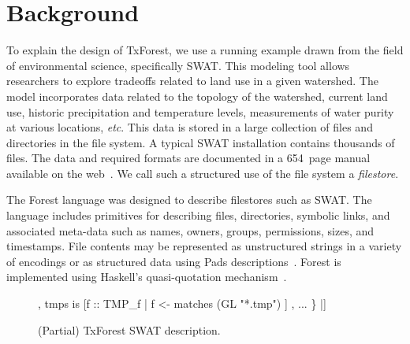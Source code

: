 \section{Background}
\label{sec:Background}


To explain the design of TxForest, we use a running example drawn from
the field of environmental science, specifically SWAT.  This modeling
tool allows researchers to explore tradeoffs related to land use in a
given watershed.  The model incorporates data related to the topology
of the watershed, current land use, historic precipitation and
temperature levels, measurements of water purity at various locations,
\textit{etc}.  This data is stored in a large collection of files and
directories in the file system.  A typical SWAT installation contains
thousands of files.  The data and required formats are documented in a
654~page manual available on the web~\cite{SWAT-IO-Documentation}. We
call such a structured use of the file system a \textit{filestore}.

The Forest language was designed to describe filestores such as SWAT.
The language includes primitives for describing files, directories,
symbolic links, and associated meta-data such as names, owners,
groups, permissions, sizes, and timestamps.  File contents may be
represented as unstructured strings in a variety of encodings or as
structured data using Pads
descriptions~\cite{fisher+:pads,fisher-walker:icdt}. Forest is
implemented using Haskell's quasi-quotation
mechanism~\cite{Mainland:quasi}.

\begin{figure}
\begin{code}
[txforest|
  \kw{data} Preamble\_f  = File Preamble
  data BSN\_f       = File SwatFile
  data PCP\_f       = File PCP
  data TMP\_f       = File TMP

  data Flow\_f      = File Flow                  
  data RCH\_f       = File RCH                   
  data Deviation\_f = File Deviation     
  ...                                        
  data Swat\_d = Directory 
     \{ cio \kw{is} "file.cio" :: Preamble\_f      
     , basin is <| getBasinPath cio |> :: BSN\_f          
     , pcps  is [f :: PCP\_f | f <- matches (GL "*.pcp") ] 
     , tmps  is [f :: TMP\_f | f <- matches (GL "*.tmp") ] 
     , ...
     \}
|]
\end{code}
\caption{(Partial) TxForest SWAT description. }
\label{fig:SWAT-description}
\end{figure}


